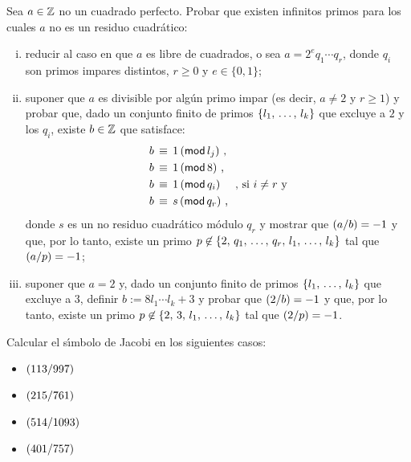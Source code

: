 \begin{ejerEcuacion}
	Sea $a\in\Enteros$ no un cuadrado perfecto. Probar que existen
	infinitos primos para los cuales $a$ no es un residuo cuadr\'atico:
	\begin{enumerate}[(i)]
		\item reducir al caso en que $a$ es libre de cuadrados, o
			sea $a=2^eq_1\cdots q_r$, donde $q_i$ son primos
			impares distintos, $r\geq 0$ y $e\in\{0,1\}$;
		\item suponer que $a$ es divisible por alg\'un primo impar
			(es decir, $a\neq 2$ y $r\geq 1$) y probar que,
			dado un conjunto finito de primos $\{\lista l{k}\}$
			que excluye a $2$ y los $q_i$, existe $b\in\Enteros$
			que satisface:
			\begin{displaymath}
				\begin{aligned}
					b & \,\equiv\,1\tmodulo[l_j]
						\text{ ,} \\
					b & \,\equiv\,1\tmodulo[8]
						\text{ ,} \\
					b & \,\equiv\,1\tmodulo[q_i]
					\quad\text{ , si }i\neq r
					\text{ y} \\
					b & \,\equiv\,s\tmodulo[q_r]
					\text{ ,}
				\end{aligned}
			\end{displaymath}
			donde $s$ es un no residuo cuadr\'atico m\'odulo
			$q_r$ y mostrar que $\tjacobi a{b}=-1$ y que,
			por lo tanto, existe un primo
			$p\not\in\{2,\,\lista q{r},\,\lista l{k}\}$
			tal que $\tlegendre a{p}=-1$;
		\item suponer que $a=2$ y, dado un conjunto finito de
			primos $\{\lista l{k}\}$ que excluye a $3$, definir
			$b:=8l_1\cdots l_k+3$ y probar que $\tjacobi 2{b}=-1$
			y que, por lo tanto, existe un primo
			$p\not\in\{2,\,3,\,\lista l{k}\}$ tal que
			$\tlegendre 2{p}=-1$.
	\end{enumerate}
\end{ejerEcuacion}

\begin{ejerEcuacion}
	Calcular el s\'{\i}mbolo de Jacobi en los siguientes casos:
	\begin{itemize}
		\item $\tjacobi{113}{997}$
		\item $\tjacobi{215}{761}$
		\item $\tjacobi{514}{1093}$
		\item $\tjacobi{401}{757}$
	\end{itemize}
\end{ejerEcuacion}


